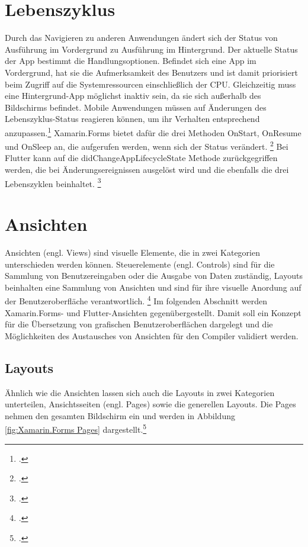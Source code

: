 \section{Lebenszyklus}
Durch das Navigieren zu anderen Anwendungen ändert sich der Status von Ausführung im Vordergrund zu Ausführung im Hintergrund.  Der aktuelle Status der App bestimmt die Handlungsoptionen.  Befindet sich eine App im Vordergrund, hat sie die Aufmerksamkeit des Benutzers und ist damit priorisiert beim Zugriff auf die Systemressourcen einschließlich der CPU.  Gleichzeitig muss eine Hintergrund-App möglichst inaktiv sein,  da sie sich außerhalb des Bildschirms befindet.  Mobile Anwendungen müssen auf Änderungen des Lebenszyklus-Status reagieren können, um ihr Verhalten entsprechend anzupassen.\footcite[Vgl.][Abgerufen am \today]{AppleLifecycycle2020} Xamarin.Forms bietet dafür die  drei Methoden \glq OnStart\grq , \glq OnResume\grq{} und \glq OnSleep\grq{} an,  die aufgerufen werden, wenn sich der Status verändert. \footcite[Vgl.][Abgerufen am \today]{MicrosoftXamLifecycle2020} Bei Flutter kann auf die \glq didChangeAppLifecycleState\grq{} Methode zurückgegriffen werden, die bei Änderungsereignissen ausgelöst wird und die ebenfalls die drei Lebenszyklen beinhaltet. \footcite[Vgl.][Abgerufen am \today]{GoogleFlutterLifeCycle2020} 

\section{Ansichten}
Ansichten (engl. Views) sind visuelle Elemente, die in zwei Kategorien unterschieden werden können.  Steuerelemente (engl. Controls) sind für die Sammlung von Benutzereingaben oder die Ausgabe von Daten zuständig,  Layouts beinhalten eine Sammlung von Ansichten und sind für ihre visuelle Anordung auf der Benutzeroberfläche verantwortlich.  \footcite[Vgl.][Abgerufen am \today]{Ritscher2020} Im folgenden Abschnitt werden Xamarin.Forms- und Flutter-Ansichten gegenübergestellt.  Damit soll ein Konzept für die Übersetzung von grafischen Benutzeroberflächen dargelegt und die Möglichkeiten des Austausches von Ansichten für den Compiler validiert werden.

\subsection{Layouts}
Ähnlich wie die Ansichten lassen sich auch die Layouts in zwei Kategorien unterteilen, Ansichtsseiten (engl. Pages) sowie die generellen Layouts.  Die Pages nehmen den gesamten Bildschirm ein und werden in Abbildung \ref{fig:Xamarin.Forms Pages} dargestellt.\footcite[Vgl.][Abgerufen am \today]{MicrosoftXamPages2016}  

